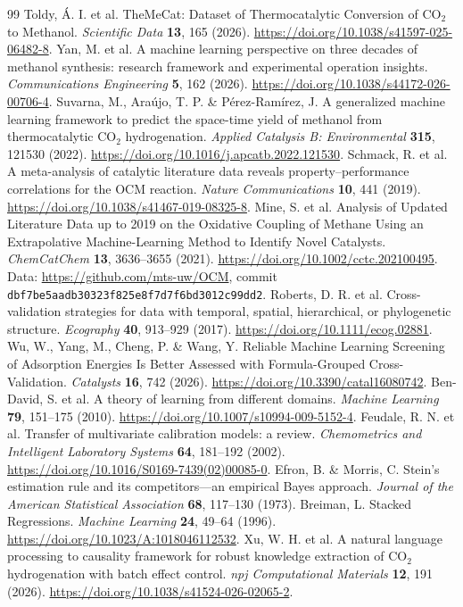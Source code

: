 \begin{thebibliography}{99}\small\setlength{\itemsep}{1pt}
 Toldy, \'A. I. et al. TheMeCat: Dataset of Thermocatalytic Conversion of CO$_2$ to Methanol. \emph{Scientific Data} \textbf{13}, 165 (2026). \url{https://doi.org/10.1038/s41597-025-06482-8}.
 Yan, M. et al. A machine learning perspective on three decades of methanol synthesis: research framework and experimental operation insights. \emph{Communications Engineering} \textbf{5}, 162 (2026). \url{https://doi.org/10.1038/s44172-026-00706-4}.
 Suvarna, M., Ara\'ujo, T. P. \& P\'erez-Ram\'irez, J. A generalized machine learning framework to predict the space-time yield of methanol from thermocatalytic CO$_2$ hydrogenation. \emph{Applied Catalysis B: Environmental} \textbf{315}, 121530 (2022). \url{https://doi.org/10.1016/j.apcatb.2022.121530}.
 Schmack, R. et al. A meta-analysis of catalytic literature data reveals property--performance correlations for the OCM reaction. \emph{Nature Communications} \textbf{10}, 441 (2019). \url{https://doi.org/10.1038/s41467-019-08325-8}.
 Mine, S. et al. Analysis of Updated Literature Data up to 2019 on the Oxidative Coupling of Methane Using an Extrapolative Machine-Learning Method to Identify Novel Catalysts. \emph{ChemCatChem} \textbf{13}, 3636--3655 (2021). \url{https://doi.org/10.1002/cctc.202100495}. Data: \url{https://github.com/mts-uw/OCM}, commit \texttt{dbf7be5aadb30323f825e8f7d7f6bd3012c99dd2}.
 Roberts, D. R. et al. Cross-validation strategies for data with temporal, spatial, hierarchical, or phylogenetic structure. \emph{Ecography} \textbf{40}, 913--929 (2017). \url{https://doi.org/10.1111/ecog.02881}.
 Wu, W., Yang, M., Cheng, P. \& Wang, Y. Reliable Machine Learning Screening of Adsorption Energies Is Better Assessed with Formula-Grouped Cross-Validation. \emph{Catalysts} \textbf{16}, 742 (2026). \url{https://doi.org/10.3390/catal16080742}.
 Ben-David, S. et al. A theory of learning from different domains. \emph{Machine Learning} \textbf{79}, 151--175 (2010). \url{https://doi.org/10.1007/s10994-009-5152-4}.
 Feudale, R. N. et al. Transfer of multivariate calibration models: a review. \emph{Chemometrics and Intelligent Laboratory Systems} \textbf{64}, 181--192 (2002). \url{https://doi.org/10.1016/S0169-7439(02)00085-0}.
 Efron, B. \& Morris, C. Stein's estimation rule and its competitors---an empirical Bayes approach. \emph{Journal of the American Statistical Association} \textbf{68}, 117--130 (1973).
 Breiman, L. Stacked Regressions. \emph{Machine Learning} \textbf{24}, 49--64 (1996). \url{https://doi.org/10.1023/A:1018046112532}.
 Xu, W. H. et al. A natural language processing to causality framework for robust knowledge extraction of CO$_2$ hydrogenation with batch effect control. \emph{npj Computational Materials} \textbf{12}, 191 (2026). \url{https://doi.org/10.1038/s41524-026-02065-2}.


\end{thebibliography}
